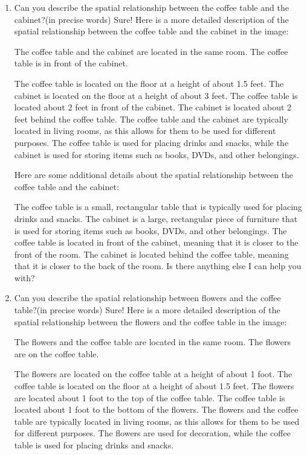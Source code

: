 \begin{enumerate}
    \item Can you describe the spatial relationship between the coffee table and the cabinet?(in precise words)
    \subitem 
    Sure! Here is a more detailed description of the spatial relationship between the coffee table and the cabinet in the image:
    
    The coffee table and the cabinet are located in the same room. The coffee table is in front of the cabinet.
    
    The coffee table is located on the floor at a height of about 1.5 feet.
    The cabinet is located on the floor at a height of about 3 feet.
    The coffee table is located about 2 feet in front of the cabinet.
    The cabinet is located about 2 feet behind the coffee table.
    The coffee table and the cabinet are typically located in living rooms, as this allows for them to be used for different purposes. The coffee table is used for placing drinks and snacks, while the cabinet is used for storing items such as books, DVDs, and other belongings.
    
    Here are some additional details about the spatial relationship between the coffee table and the cabinet:
    
    The coffee table is a small, rectangular table that is typically used for placing drinks and snacks.
    The cabinet is a large, rectangular piece of furniture that is used for storing items such as books, DVDs, and other belongings.
    The coffee table is located in front of the cabinet, meaning that it is closer to the front of the room.
    The cabinet is located behind the coffee table, meaning that it is closer to the back of the room.
    Is there anything else I can help you with?
    \item Can you describe the spatial relationship between flowers and the coffee table?(in precise words)
    \subitem Sure! Here is a more detailed description of the spatial relationship between the flowers and the coffee table in the image:

    The flowers and the coffee table are located in the same room. The flowers are on the coffee table.
    
    The flowers are located on the coffee table at a height of about 1 foot.
    The coffee table is located on the floor at a height of about 1.5 feet.
    The flowers are located about 1 foot to the top of the coffee table.
    The coffee table is located about 1 foot to the bottom of the flowers.
    The flowers and the coffee table are typically located in living rooms, as this allows for them to be used for different purposes. The flowers are used for decoration, while the coffee table is used for placing drinks and snacks.
    

\end{enumerate}
